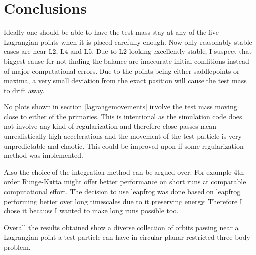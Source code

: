 \documentclass[12pt,a4paper,titlepage]{article}
\begin{document}
\section{Conclusions}
Ideally one should be able to have the test mass stay at any of the five Lagrangian points when it is placed carefully enough. Now only reasonably stable cases are near L2, L4 and L5. Due to L2 looking excellently stable, I suspect that biggest cause for not finding the balance are inaccurate initial conditions instead of major computational errors. Due to the points being either saddlepoints or maxima, a very small deviation from the exact position will cause the test mass to drift away.

No plots shown in section \ref{lagrangemovements} involve the test mass moving close to either of the primaries. This is intentional as the simulation code does not involve any kind of regularization and therefore close passes mean unrealistically high accelerations and the movement of the test particle is very unpredictable and chaotic. This could be improved upon if some regularization method was implemented.

Also the choice of the integration method can be argued over. For example 4th order Runge-Kutta might offer better performance on short runs at comparable computational effort. The decision to use leapfrog was done based on leapfrog performing better over long timescales due to it preserving energy. Therefore I chose it because I wanted to make long runs possible too.

Overall the results obtained show a diverse collection of orbits passing near a Lagrangian point a test particle can have in circular planar restricted three-body problem.

\newpage


\end{document}

